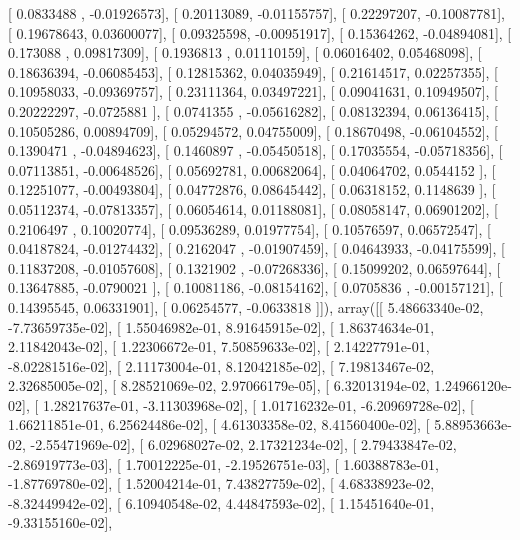 \documentclass{article}
\begin{document}
       [ 0.0833488 , -0.01926573],
       [ 0.20113089, -0.01155757],
       [ 0.22297207, -0.10087781],
       [ 0.19678643,  0.03600077],
       [ 0.09325598, -0.00951917],
       [ 0.15364262, -0.04894081],
       [ 0.173088  ,  0.09817309],
       [ 0.1936813 ,  0.01110159],
       [ 0.06016402,  0.05468098],
       [ 0.18636394, -0.06085453],
       [ 0.12815362,  0.04035949],
       [ 0.21614517,  0.02257355],
       [ 0.10958033, -0.09369757],
       [ 0.23111364,  0.03497221],
       [ 0.09041631,  0.10949507],
       [ 0.20222297, -0.0725881 ],
       [ 0.0741355 , -0.05616282],
       [ 0.08132394,  0.06136415],
       [ 0.10505286,  0.00894709],
       [ 0.05294572,  0.04755009],
       [ 0.18670498, -0.06104552],
       [ 0.1390471 , -0.04894623],
       [ 0.1460897 , -0.05450518],
       [ 0.17035554, -0.05718356],
       [ 0.07113851, -0.00648526],
       [ 0.05692781,  0.00682064],
       [ 0.04064702,  0.0544152 ],
       [ 0.12251077, -0.00493804],
       [ 0.04772876,  0.08645442],
       [ 0.06318152,  0.1148639 ],
       [ 0.05112374, -0.07813357],
       [ 0.06054614,  0.01188081],
       [ 0.08058147,  0.06901202],
       [ 0.2106497 ,  0.10020774],
       [ 0.09536289,  0.01977754],
       [ 0.10576597,  0.06572547],
       [ 0.04187824, -0.01274432],
       [ 0.2162047 , -0.01907459],
       [ 0.04643933, -0.04175599],
       [ 0.11837208, -0.01057608],
       [ 0.1321902 , -0.07268336],
       [ 0.15099202,  0.06597644],
       [ 0.13647885, -0.0790021 ],
       [ 0.10081186, -0.08154162],
       [ 0.0705836 , -0.00157121],
       [ 0.14395545,  0.06331901],
       [ 0.06254577, -0.0633818 ]]), array([[  5.48663340e-02,  -7.73659735e-02],
       [  1.55046982e-01,   8.91645915e-02],
       [  1.86374634e-01,   2.11842043e-02],
       [  1.22306672e-01,   7.50859633e-02],
       [  2.14227791e-01,  -8.02281516e-02],
       [  2.11173004e-01,   8.12042185e-02],
       [  7.19813467e-02,   2.32685005e-02],
       [  8.28521069e-02,   2.97066179e-05],
       [  6.32013194e-02,   1.24966120e-02],
       [  1.28217637e-01,  -3.11303968e-02],
       [  1.01716232e-01,  -6.20969728e-02],
       [  1.66211851e-01,   6.25624486e-02],
       [  4.61303358e-02,   8.41560400e-02],
       [  5.88953663e-02,  -2.55471969e-02],
       [  6.02968027e-02,   2.17321234e-02],
       [  2.79433847e-02,  -2.86919773e-03],
       [  1.70012225e-01,  -2.19526751e-03],
       [  1.60388783e-01,  -1.87769780e-02],
       [  1.52004214e-01,   7.43827759e-02],
       [  4.68338923e-02,  -8.32449942e-02],
       [  6.10940548e-02,   4.44847593e-02],
       [  1.15451640e-01,  -9.33155160e-02],
\end{document}
